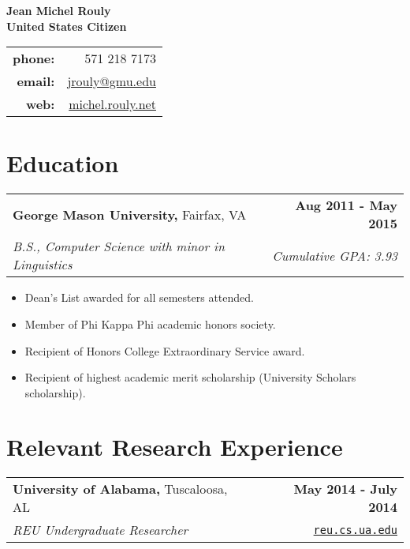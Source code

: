 \documentclass[letterpaper]{article}
\newenvironment{details}
{\begin{itemize}}
{\end{itemize}}
\begin{document}
  \setcounter{secnumdepth}{0}

  \begin{multicols}{2}
    \noindent\huge\textbf{Jean Michel Rouly}\\
    \noindent\normalsize\textbf{United States Citizen}

    \columnbreak

    \raggedleft
    \begin{tabular}{@{}rr@{}}
    \textbf{phone:}  &  571 218 7173\\
    \textbf{email:}  &  \href{mailto:jrouly@gmu.edu}{jrouly@gmu.edu}\\
    \textbf{web:}    &  \href{michel.rouly.net}{michel.rouly.net}
    \end{tabular}
  \end{multicols}


  \section{Education}

  \noindent
  \begin{tabularx}{\textwidth}{@{}X r@{}}
    \textbf{George Mason University,} Fairfax, VA & \textbf{Aug 2011 - May 2015} \\
    \emph{B.S., Computer Science with minor in Linguistics} & \emph{Cumulative GPA: 3.93}
  \end{tabularx}

  \begin{details}
  \item Dean's List awarded for all semesters attended.
  \item Member of Phi Kappa Phi academic honors society.
  \item Recipient of Honors College Extraordinary Service award.
  \item Recipient of highest academic merit scholarship (University Scholars scholarship).
  \end{details}


  \section{Relevant Research Experience}

  \noindent
  \begin{tabularx}{\textwidth}{@{}X r@{}}
    \textbf{University of Alabama,} Tuscaloosa, AL & \textbf{May 2014 - July 2014} \\
    \emph{REU Undergraduate Researcher} & \texttt{\href{reu.cs.ua.edu}{reu.cs.ua.edu}}
  \end{tabularx}
\end{document}
